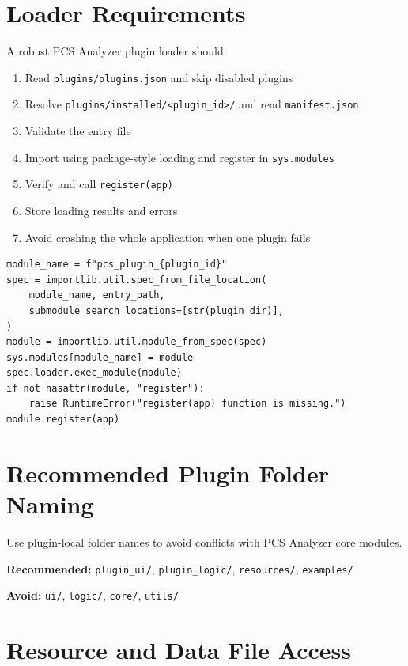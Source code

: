 \documentclass[11pt, a4paper]{article}
\begin{document}
\section{Loader Requirements}

A robust PCS Analyzer plugin loader should:

\begin{enumerate}
  \item Read \texttt{plugins/plugins.json} and skip disabled plugins
  \item Resolve \texttt{plugins/installed/<plugin\_id>/} and read \texttt{manifest.json}
  \item Validate the entry file
  \item Import using package-style loading and register in \texttt{sys.modules}
  \item Verify and call \texttt{register(app)}
  \item Store loading results and errors
  \item Avoid crashing the whole application when one plugin fails
\end{enumerate}

\begin{lstlisting}[style=python]
module_name = f"pcs_plugin_{plugin_id}"
spec = importlib.util.spec_from_file_location(
    module_name, entry_path,
    submodule_search_locations=[str(plugin_dir)],
)
module = importlib.util.module_from_spec(spec)
sys.modules[module_name] = module
spec.loader.exec_module(module)
if not hasattr(module, "register"):
    raise RuntimeError("register(app) function is missing.")
module.register(app)
\end{lstlisting}

\section{Recommended Plugin Folder Naming}

Use plugin-local folder names to avoid conflicts with PCS Analyzer core modules.

\textbf{Recommended:} \texttt{plugin\_ui/}, \texttt{plugin\_logic/}, \texttt{resources/}, \texttt{examples/}

\textbf{Avoid:} \texttt{ui/}, \texttt{logic/}, \texttt{core/}, \texttt{utils/}

\section{Resource and Data File Access}
\end{document}
